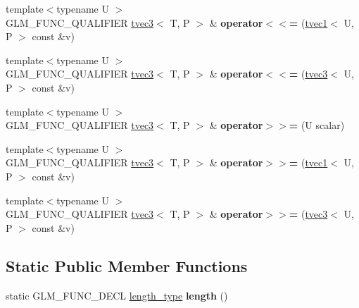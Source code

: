 \begin{DoxyCompactItemize}
{\footnotesize template$<$typename U $>$ }\\G\+L\+M\+\_\+\+F\+U\+N\+C\+\_\+\+Q\+U\+A\+L\+I\+F\+I\+ER \hyperlink{structglm_1_1tvec3}{tvec3}$<$ T, P $>$ \& {\bfseries operator$<$$<$=} (\hyperlink{structglm_1_1tvec1}{tvec1}$<$ U, P $>$ const \&v)
\item 
\mbox{\label{structglm_1_1tvec3_a7c12511c3769c0e7822bc884af40f3a2}} 
{\footnotesize template$<$typename U $>$ }\\G\+L\+M\+\_\+\+F\+U\+N\+C\+\_\+\+Q\+U\+A\+L\+I\+F\+I\+ER \hyperlink{structglm_1_1tvec3}{tvec3}$<$ T, P $>$ \& {\bfseries operator$<$$<$=} (\hyperlink{structglm_1_1tvec3}{tvec3}$<$ U, P $>$ const \&v)
\item 
\mbox{\label{structglm_1_1tvec3_a2a74bf77a4e9edbe14166fdfedb7f3f9}} 
{\footnotesize template$<$typename U $>$ }\\G\+L\+M\+\_\+\+F\+U\+N\+C\+\_\+\+Q\+U\+A\+L\+I\+F\+I\+ER \hyperlink{structglm_1_1tvec3}{tvec3}$<$ T, P $>$ \& {\bfseries operator$>$$>$=} (U scalar)
\item 
\mbox{\label{structglm_1_1tvec3_a2f08b19372b6573b24cb81ed5657f8a3}} 
{\footnotesize template$<$typename U $>$ }\\G\+L\+M\+\_\+\+F\+U\+N\+C\+\_\+\+Q\+U\+A\+L\+I\+F\+I\+ER \hyperlink{structglm_1_1tvec3}{tvec3}$<$ T, P $>$ \& {\bfseries operator$>$$>$=} (\hyperlink{structglm_1_1tvec1}{tvec1}$<$ U, P $>$ const \&v)
\item 
\mbox{\label{structglm_1_1tvec3_adfdb21940170dce288bebfff52613ebc}} 
{\footnotesize template$<$typename U $>$ }\\G\+L\+M\+\_\+\+F\+U\+N\+C\+\_\+\+Q\+U\+A\+L\+I\+F\+I\+ER \hyperlink{structglm_1_1tvec3}{tvec3}$<$ T, P $>$ \& {\bfseries operator$>$$>$=} (\hyperlink{structglm_1_1tvec3}{tvec3}$<$ U, P $>$ const \&v)
\end{DoxyCompactItemize}
\subsection*{Static Public Member Functions}
\begin{DoxyCompactItemize}
\item 
\mbox{\label{structglm_1_1tvec3_a484e455bf464a07e7679790637aaf1a7}} 
static G\+L\+M\+\_\+\+F\+U\+N\+C\+\_\+\+D\+E\+CL \hyperlink{structglm_1_1tvec3_a3a79c6a1cfc9fb8821a0a878fa2de91a}{length\+\_\+type} {\bfseries length} ()
\end{DoxyCompactItemize}
